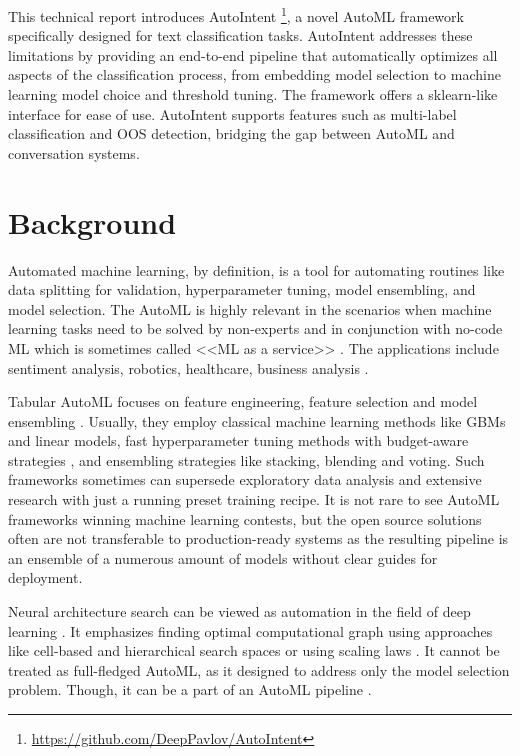 This technical report introduces AutoIntent \footnote{\url{https://github.com/DeepPavlov/AutoIntent}}, a novel AutoML framework specifically designed for text classification tasks. AutoIntent addresses these limitations by providing an end-to-end pipeline that automatically optimizes all aspects of the classification process, from embedding model selection to machine learning model choice and threshold tuning. The framework offers a sklearn-like interface \cite{pedregosa2018scikitlearnmachinelearningpython} for ease of use. AutoIntent supports features such as multi-label classification and OOS detection, bridging the gap between AutoML and conversation systems.

\section{Background}

Automated machine learning, by definition, is a tool for automating routines like data splitting for validation, hyperparameter tuning, model ensembling, and model selection. The AutoML is highly relevant in the scenarios when machine learning tasks need to be solved by non-experts and in conjunction with no-code ML which is sometimes called <<ML as a service>> \cite{bisong2019overview,barga2015predictive,liberty2020elastic,ledell2020h2o,carney2020teachable,acito2023predictive}. The applications include sentiment analysis, robotics, healthcare, business analysis \cite{yuan2024automated,salehin2024automl}.

Tabular AutoML focuses on feature engineering, feature selection and model ensembling \cite{feurer2022autosklearn20handsfreeautoml, vakhrushev2022lightautomlautomlsolutionlarge, erickson2020autogluontabularrobustaccurateautoml, ledell2020h2o, nikitin2021automated}. Usually, they employ classical machine learning methods like GBMs \cite{chen2016xgboost,prokhorenkova2018catboost,ke2017lightgbm} and linear models, fast hyperparameter tuning methods with budget-aware strategies \cite{akiba2019optuna}, and ensembling strategies like stacking, blending and voting. Such frameworks sometimes can supersede exploratory data analysis and extensive research with just a running preset training recipe. It is not rare to see AutoML frameworks winning machine learning contests, but the open source solutions often are not transferable to production-ready systems as the resulting pipeline is an ensemble of a numerous amount of models without clear guides for deployment.

Neural architecture search can be viewed as automation in the field of deep learning \cite{salehin2024automl}. It emphasizes finding optimal computational graph using approaches like cell-based and hierarchical search spaces \cite{zoph2018learningtransferablearchitecturesscalable,real2019regularizedevolutionimageclassifier} or using scaling laws \cite{tan2020efficientnetrethinkingmodelscaling}. It cannot be treated as full-fledged AutoML, as it designed to address only the model selection problem. Though, it can be a part of an AutoML pipeline \cite{autokeras}.

